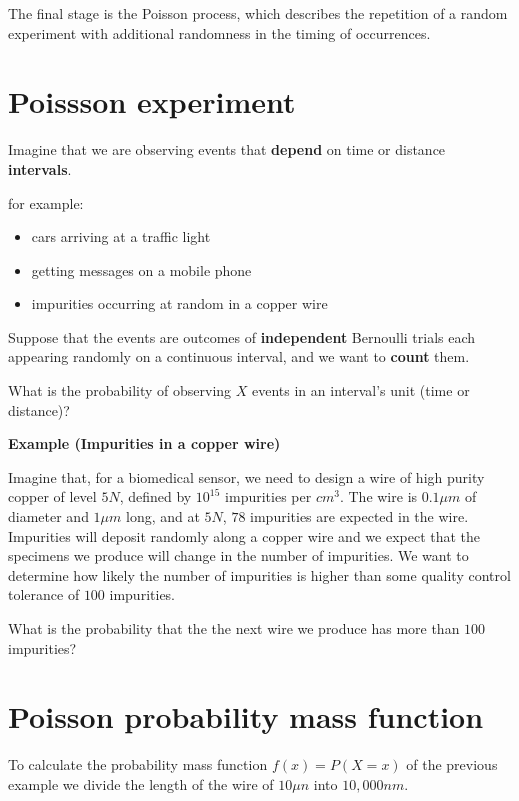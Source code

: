 \documentclass[
]{book}
\providecommand{\tightlist}{%
  \setlength{\itemsep}{0pt}\setlength{\parskip}{0pt}}
\begin{document}
The final stage is the Poisson process, which describes the repetition of a random experiment with additional randomness in the timing of occurrences.

\hypertarget{poissson-experiment}{%
\section{Poissson experiment}\label{poissson-experiment}}

Imagine that we are observing events that \textbf{depend} on time or distance \textbf{intervals}.

for example:

\begin{itemize}
\tightlist
\item
  cars arriving at a traffic light
\item
  getting messages on a mobile phone
\item
  impurities occurring at random in a copper wire
\end{itemize}

Suppose that the events are outcomes of \textbf{independent} Bernoulli trials each appearing randomly on a continuous interval, and we want to \textbf{count} them.

What is the probability of observing \(X\) events in an interval's unit (time or distance)?

\textbf{Example (Impurities in a copper wire)}

Imagine that, for a biomedical sensor, we need to design a wire of high purity copper of level \(5N\), defined by \(10^{15}\) impurities per \(cm^3\). The wire is \(0.1\mu m\) of diameter and \(1\mu m\) long, and at \(5N\), \(78\) impurities are expected in the wire. Impurities will deposit randomly along a copper wire and we expect that the specimens we produce will change in the number of impurities. We want to determine how likely the number of impurities is higher than some quality control tolerance of \(100\) impurities.

What is the probability that the the next wire we produce has more than \(100\) impurities?

\hypertarget{poisson-probability-mass-function}{%
\section{Poisson probability mass function}\label{poisson-probability-mass-function}}

To calculate the probability mass function \(f(x)=P(X=x)\) of the previous example we divide the length of the wire of \(10\mu n\) into \(10,000nm\).
\end{document}
